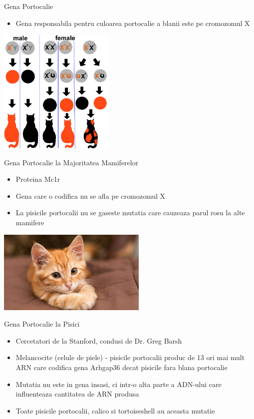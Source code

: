 \documentclass{beamer}
\begin{document}
\begin{frame}{Gena Portocalie}
    \begin{itemize}
        \item Gena responsabila pentru culoarea portocalie a blanii este pe cromozomul X
    \end{itemize}
    \centering
    \begin{minipage}{0.5\textwidth}
        \centering
        \includegraphics[height=6cm]{x-chromosomes.jpg}
    \end{minipage}
\end{frame}

\begin{frame}{Gena Portocalie la Majoritatea Mamiferelor}
    \begin{itemize}
        \item Proteina Mc1r
        \item Gena care o codifica nu se afla pe cromozomul X
        \item La pisicile portocalii nu se gaseste mutatia care cauzeaza parul rosu la alte mamifere
    \end{itemize}
    \centering
    \begin{minipage}{0.6\textwidth}
        \centering
        \includegraphics[height=4cm]{cat-breathing-fast-orange-kitten.jpg}
    \end{minipage}
\end{frame}

\begin{frame}{Gena Portocalie la Pisici}
    \begin{itemize}
        \item Cercetatori de la Stanford, condusi de Dr. Greg Barsh
        \item Melancocite (celule de piele) - pisicile portocalii produc de 13 ori mai mult ARN care codifica gena Arhgap36 decat pisicile fara blana portocalie
        \item Mutatia nu este in gena insasi, ci intr-o alta parte a ADN-ului care influenteaza cantitatea de ARN produsa
        \item Toate pisicile portocalii, calico si tortoiseshell au aceasta mutatie
    \end{itemize}
\end{frame}
\end{document}
